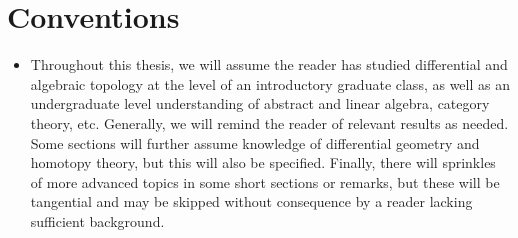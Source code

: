 \chapter*{Conventions}

\begin{itemize}
  \item Throughout this thesis, we will assume the reader has studied differential and algebraic topology at the level of an introductory graduate class, as well as an undergraduate level understanding of abstract and linear algebra, category theory, etc. Generally, we will remind the reader of relevant results as needed.
  Some sections will further assume knowledge of differential geometry and homotopy theory, but this will also be specified. Finally, there will sprinkles of more advanced topics in some short sections or remarks, but these will be tangential and may be skipped without consequence by a reader lacking sufficient background.
\end{itemize}
